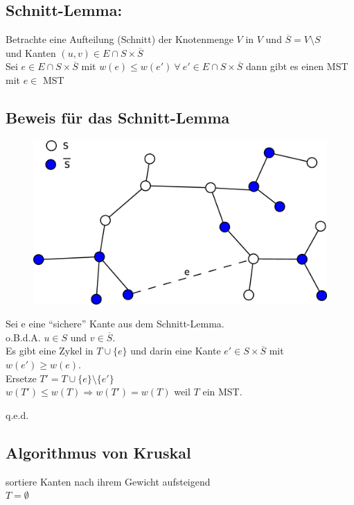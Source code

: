 \subsection{Schnitt-Lemma:}
Betrachte eine Aufteilung (Schnitt) der Knotenmenge $V$ in $V$ und $\overline{S} = V\setminus S$ \\und Kanten $(u,v) \in E \cap S\times \overline{S}$\\
Sei $e \in E \cap S \times \overline{S}$ mit $w(e) \leq w(e') ~\forall ~e' \in E \cap S\times \overline{S}$ dann gibt es einen MST mit $e \in$ MST
\subsection{Beweis für das Schnitt-Lemma}
\begin{figure}[h]
\centering
\includegraphics[width=0.5\linewidth]{19/Grafik/SpannbaumBeweis}
\caption{}
\label{fig:SpannbaumBeweis}
\end{figure}

Sei e eine "`sichere"' Kante aus dem Schnitt-Lemma.\\
o.B.d.A. $u\in S$ und $v \in \overline{S}$.\\
Es gibt eine Zykel in $T\cup \{e\}$ und darin eine Kante $e'\in S\times \overline{S}$ mit $w(e') \geq w(e)$.\\
Ersetze $T'=T\cup\{e\}\setminus\{ e' \}$\\
$w(T') \leq w(T) \Rightarrow w(T') = w(T)$ weil $T$ ein MST.
\begin{flushright}
	q.e.d.
\end{flushright}
\subsection{Algorithmus von Kruskal}
sortiere Kanten nach ihrem Gewicht aufsteigend\\
$T=\emptyset$\\

